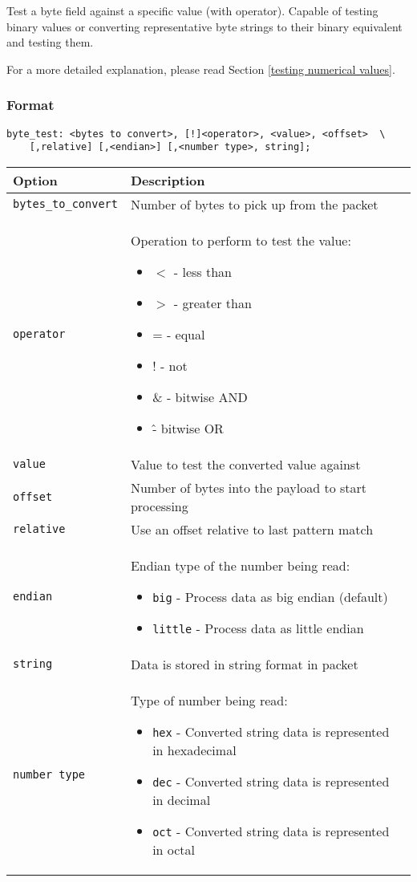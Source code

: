 \documentclass[english]{report}
\begin{document}
Test a byte field against a specific value (with operator).  Capable
 of testing binary values or converting representative byte strings to
their binary equivalent and testing them.

For a more detailed explanation, please read Section \ref{testing numerical values}.

\subsubsection{Format}

\begin{verbatim}
byte_test: <bytes to convert>, [!]<operator>, <value>, <offset>  \
    [,relative] [,<endian>] [,<number type>, string];
\end{verbatim}
			
	
\begin{tabular}{| l | p{5in} |}
\hline
{\bf Option} & {\bf Description}\\
\hline
\hline
\texttt{bytes\_to\_convert} & Number of bytes to pick up from the packet\\
\hline
\texttt{operator} & Operation to perform to test the value:
\begin{itemize}
\item $<$ - less than
\item $>$ - greater than
\item = - equal
\item ! - not
\item \& - bitwise AND
\item \^ - bitwise OR
\end{itemize}\\
\hline
\texttt{value} & Value to test the converted value against\\
\hline
\texttt{offset} & Number of bytes into the payload to start processing\\
\hline
\texttt{relative} & Use an offset relative to last pattern match\\
\hline
\texttt{endian} & Endian type of the number being read: 
\begin{itemize}
\item \texttt{big} - Process data as big endian (default)
\item \texttt{little} - Process data as little endian
\end{itemize}\\
\hline
\texttt{string} & Data is stored in string format in packet\\
\hline
\texttt{number type} & Type of number being read:
\begin{itemize}
\item \texttt{hex} - Converted string data is represented in hexadecimal
\item \texttt{dec} - Converted string data is represented in decimal
\item \texttt{oct} - Converted string data is represented in octal
\end{itemize}\\
\hline
\end{tabular}
\end{document}
